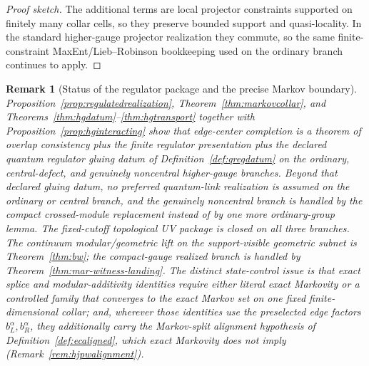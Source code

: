 \documentclass[11pt]{article}
\newtheorem{remark}[theorem]{Remark}
\begin{document}
\begin{proof}[Proof sketch]
The additional terms are local projector constraints supported on finitely many collar cells, so they preserve bounded support and quasi-locality. In the standard higher-gauge projector realization they commute, so the same finite-constraint MaxEnt/Lieb--Robinson bookkeeping used on the ordinary branch continues to apply.
\end{proof}

\begin{remark}[Status of the regulator package and the precise Markov boundary]
Proposition~\ref{prop:regulatedrealization}, Theorem~\ref{thm:markovcollar}, and Theorems~\ref{thm:hgdatum}--\ref{thm:hgtransport} together with Proposition~\ref{prop:hginteracting} show that edge-center completion is a theorem of overlap consistency plus the finite regulator presentation plus the declared quantum regulator gluing datum of Definition~\ref{def:qregdatum} on the ordinary, central-defect, and genuinely noncentral higher-gauge branches. Beyond that declared gluing datum, no preferred quantum-link realization is assumed on the ordinary or central branch, and the genuinely noncentral branch is handled by the compact crossed-module replacement instead of by one more ordinary-group lemma. The fixed-cutoff topological UV package is closed on all three branches. The continuum modular/geometric lift on the support-visible geometric subnet is Theorem~\ref{thm:bw}; the compact-gauge realized branch is handled by Theorem~\ref{thm:mar-witness-landing}. The distinct state-control issue is that exact splice and modular-additivity identities require either literal exact Markovity or a controlled family that converges to the exact Markov set on one fixed finite-dimensional collar; and, wherever those identities use the preselected edge factors \(b_L^\alpha,b_R^\alpha\), they additionally carry the Markov-split alignment hypothesis of Definition~\ref{def:ecaligned}, which exact Markovity does not imply (Remark~\ref{rem:hjpwalignment}).
\end{remark}
\end{document}

